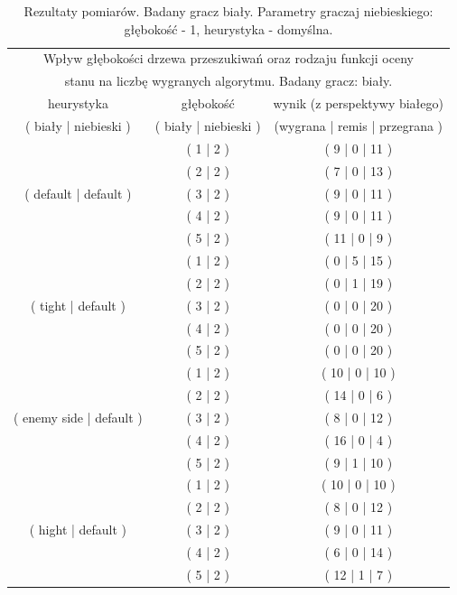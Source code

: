 \begin{table}[htbp!]
    \centering
    \begin{tabular}{ |c|c|c|}
            \hline
            \multicolumn{3}{|c|}{Wpływ głębokości drzewa przeszukiwań oraz rodzaju funkcji oceny} \\
            \multicolumn{3}{|c|}{stanu na liczbę wygranych algorytmu. Badany gracz: biały.} \\
            \hline
            heurystyka & głębokość & wynik (z perspektywy białego) \\
            ( biały | niebieski ) & ( biały | niebieski ) & (wygrana | remis | przegrana ) \\
            \hline
            \multirow{5}{*}{( default | default )} & ( 1 | 2 ) & ( 9 | 0 | 11 ) \\
            \cline{2-3}
             & ( 2 | 2 ) & ( 7 | 0 | 13 ) \\
            \cline{2-3}
             & ( 3 | 2 ) & ( 9 | 0 | 11 ) \\
            \cline{2-3}
             & ( 4 | 2 ) & ( 9 | 0 | 11 ) \\
            \cline{2-3}
             & ( 5 | 2 ) & ( 11 | 0 | 9 ) \\
            \hline
            \multirow{5}{*}{( tight | default )} & ( 1 | 2 ) & ( 0 | 5 | 15 ) \\
            \cline{2-3}
             & ( 2 | 2 ) & ( 0 | 1 | 19 ) \\
            \cline{2-3}
             & ( 3 | 2 ) & ( 0 | 0 | 20 ) \\
            \cline{2-3}
             & ( 4 | 2 ) & ( 0 | 0 | 20 ) \\
            \cline{2-3}
             & ( 5 | 2 ) & ( 0 | 0 | 20 ) \\
            \hline
            \multirow{5}{*}{( enemy side | default )} & ( 1 | 2 ) & ( 10 | 0 | 10 ) \\
            \cline{2-3}
             & ( 2 | 2 ) & ( 14 | 0 | 6 ) \\
            \cline{2-3}
             & ( 3 | 2 ) & ( 8 | 0 | 12 ) \\
            \cline{2-3}
             & ( 4 | 2 ) & ( 16 | 0 | 4 ) \\
            \cline{2-3}
             & ( 5 | 2 ) & ( 9 | 1 | 10 ) \\
            \hline
            \multirow{5}{*}{( hight | default )} & ( 1 | 2 ) & ( 10 | 0 | 10 ) \\
            \cline{2-3}
             & ( 2 | 2 ) & ( 8 | 0 | 12 ) \\
            \cline{2-3}
             & ( 3 | 2 ) & ( 9 | 0 | 11 ) \\
            \cline{2-3}
             & ( 4 | 2 ) & ( 6 | 0 | 14 ) \\
            \cline{2-3}
             & ( 5 | 2 ) & ( 12 | 1 | 7 ) \\
            \hline
    \end{tabular}
    \caption{Rezultaty pomiarów. Badany gracz biały. Parametry graczaj niebieskiego: głębokość - 1, heurystyka - domyślna.}
\end{table}

